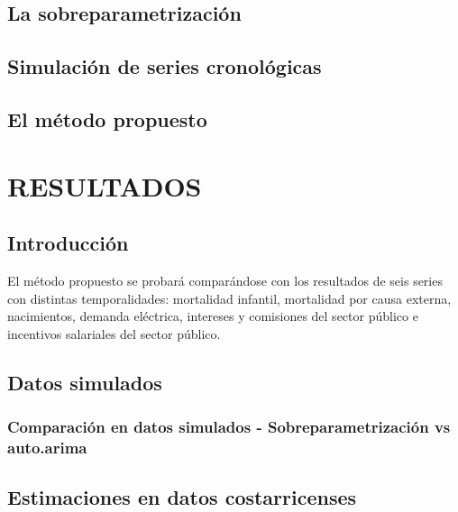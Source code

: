 \documentclass[
]{article}
\begin{document}
\subsection{La sobreparametrización}

\subsection{Simulación de series cronológicas}

\subsection{El método propuesto}

\newpage

\section{RESULTADOS}

\subsection{Introducción}

El método propuesto se probará comparándose con los resultados de seis
series con distintas temporalidades: mortalidad infantil, mortalidad por
causa externa, nacimientos, demanda eléctrica, intereses y comisiones
del sector público e incentivos salariales del sector público.

\subsection{Datos simulados}

\subsubsection{Comparación en datos simulados - Sobreparametrización vs auto.arima}

\subsection{Estimaciones en datos costarricenses}
\end{document}
